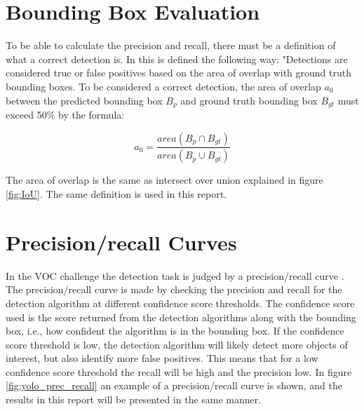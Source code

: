 \newpage

\section{Bounding Box Evaluation}
To be able to calculate the precision and recall, there must be a definition of what a correct detection is. In \citep{Everinghama} this is defined the following way: "Detections are considered true or false positives based on the area of overlap
with ground truth bounding boxes. To be considered a correct detection, the area of overlap $a_0$ between the predicted bounding box $B_p$ and ground truth bounding box $B_{gt}$ must exceed 50\% by the formula:

\begin{equation*}
    a_0 = \frac{area(B_p \cap B_{gt}) }{area(B_p \cup B_{gt})}
\end{equation*}

\noindent
The area of overlap is the same as intersect over union explained in figure \ref{fig:IoU}. The same definition is used in this report.




\section{Precision/recall Curves}

In the VOC challenge the detection task is judged by a precision/recall curve \citep{Everinghama}. The precision/recall curve is made by checking the precision and recall for the detection algorithm at different confidence score thresholds. The confidence score used is the score returned from the detection algorithms along with the bounding box, i.e., how confident the algorithm is in the bounding box. If the confidence score threshold is low, the detection algorithm will likely detect more objects of interest, but also identify more false positives. This means that for a low confidence score threshold the recall will be high and the precision low. In figure \ref{fig:yolo_prec_recall} an example of a precision/recall curve is shown, and the results in this report will be presented in the same manner. 

